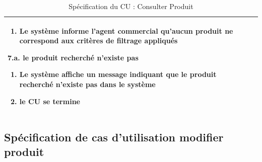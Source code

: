 \begin{table}[H]
\begin{tabularx}{\textwidth}{|l|X|}
\begin{enumerate}[leftmargin=1.5em, topsep=2pt, itemsep=1pt]
  \item Le système informe l'agent commercial qu'aucun produit ne correspond aux critères de filtrage appliqués
\end{enumerate}
\textbf{7.a. le produit recherché n'existe pas}
\begin{enumerate}[leftmargin=1.5em, topsep=2pt, itemsep=1pt]
  \item Le système affiche un message indiquant que le produit recherché n'existe pas dans le système
  \item le CU se termine
\end{enumerate} \\
\hline
\end{tabularx}
\caption{Spécification du CU : Consulter Produit}
\label{tab:cu-consulter-produit}
\end{table}

\newpage
\subsection{Spécification de cas d’utilisation modifier produit}

